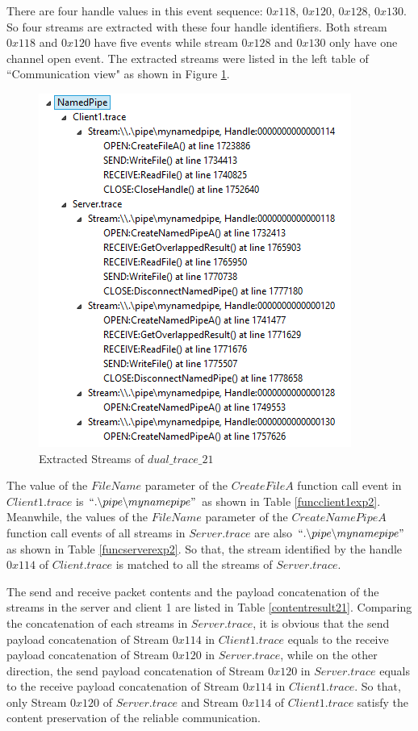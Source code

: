 There are four handle values in this event sequence: $0x118$, $0x120$, $0x128$, $0x130$. So four streams are extracted with these four handle identifiers. Both stream $0x118$ and $0x120$ have five events while stream $0x128$ and $0x130$ only have one channel open event. The extracted streams were listed in the left table  of ``Communication view"  as shown in Figure \ref{result21_streams}.

\begin{figure}[H]
\centerline{\includegraphics[scale=0.55]{Figures/result21_streams}}
 \caption{Extracted Streams of $dual\_trace\_21$}
\label{result21_streams}
\end{figure}

The value of the $FileName$ parameter of the $CreateFileA$ function call event in $Client1.trace$ is $``.\backslash pipe \backslash mynamepipe"$ as shown in Table \ref{funcclient1exp2}. Meanwhile, the values of the $FileName$ parameter of the $CreateNamePipeA$ function call events of all streams in $Server.trace$ are also $``.\backslash pipe \backslash mynamepipe"$ as shown in Table \ref{funcserverexp2}. So that, the stream identified by the handle $0x114$ of $Client.trace$ is matched to all the streams of $Server.trace$.

The send and receive packet contents and the payload concatenation of the streams in the server and client 1 are listed in Table \ref{contentresult21}. Comparing the concatenation of each streams in $Server.trace$, it is obvious that the send payload concatenation of Stream $0x114$ in $Client1.trace$ equals to the receive payload concatenation of Stream $0x120$ in $Server.trace$, while on the other direction, the send payload concatenation of Stream $0x120$ in $Server.trace$ equals to the receive payload concatenation of Stream $0x114$ in $Client1.trace$. So that, only Stream $0x120$ of $Server.trace$ and Stream $0x114$ of $Client1.trace$ satisfy the content preservation of the reliable communication. 


